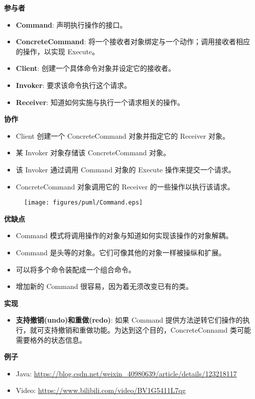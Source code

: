\noindent\textbf{参与者}

\begin{itemize}
    \item \textbf{Command}: 声明执行操作的接口。
    \item \textbf{ConcreteCommand}: 将一个接收者对象绑定与一个动作；调用接收者相应的操作，以实现 Execute。
    \item \textbf{Client}: 创建一个具体命令对象并设定它的接收者。
    \item \textbf{Invoker}: 要求该命令执行这个请求。
    \item \textbf{Receiver}: 知道如何实施与执行一个请求相关的操作。
\end{itemize}

\noindent\textbf{协作}

\begin{itemize}
    \item Client 创建一个 ConcreteCommand 对象并指定它的 Receiver 对象。
    \item 某 Invoker 对象存储该 ConcreteCommand 对象。
    \item 该 Invoker 通过调用 Command 对象的 Execute 操作来提交一个请求。
    \item ConcreteCommand 对象调用它的 Receiver 的一些操作以执行该请求。
\end{itemize}

\begin{figure}[H] 
    \centering 
    \texttt{[image: figures/puml/Command.eps]} 
\end{figure}

\noindent\textbf{优缺点}

\begin{itemize}
    \item Command 模式将调用操作的对象与知道如何实现该操作的对象解耦。
    \item Command 是头等的对象。它们可像其他的对象一样被操纵和扩展。
    \item 可以将多个命令装配成一个组合命令。
    \item 增加新的 Command 很容易，因为着无须改变已有的类。
\end{itemize}

\noindent\textbf{实现}

\begin{itemize}
    \item \textbf{支持撤销(undo)和重做(redo)}: 如果 Command 提供方法逆转它们操作的执行，就可支持撤销和重做功能。为达到这个目的，ConcreteConnamd 类可能需要格外的状态信息。 
\end{itemize}

\noindent\textbf{例子}

\begin{itemize}
    \item Java: \url{https://blog.csdn.net/weixin_40980639/article/details/123218117}
    \item Video: \url{https://www.bilibili.com/video/BV1G5411L7qg}
\end{itemize}



\newpage